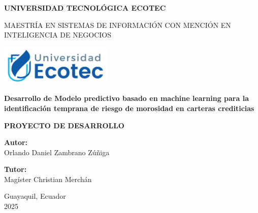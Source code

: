 \begin{titlepage}
    \begin{center}
        \vspace*{0.5cm}
        
        \Huge
        \textbf{UNIVERSIDAD TECNOLÓGICA ECOTEC}
        
        \vspace{1cm}
        
        \Large
        MAESTRÍA EN SISTEMAS DE INFORMACIÓN CON MENCIÓN EN INTELIGENCIA DE NEGOCIOS
        
        \vspace{0.5 cm}
        
        \includegraphics[width=0.4\textwidth]{images/logo.jpg}
        
        \vspace{0.5 cm}
        
        \Huge
        \textbf{Desarrollo de Modelo predictivo basado en machine learning para la identificación temprana de riesgo de morosidad en carteras crediticias}
        
        \vspace{0.5 cm}
        
        \Large
        \textbf{PROYECTO DE DESARROLLO}
        
        \vspace{0.5 cm}
        
        \Large
        \textbf{Autor:}\\
        Orlando Daniel Zambrano Zúñiga\\
        
        \vspace{0.5cm}
        
        \textbf{Tutor:}\\
        Magíster Christian Merchán\\
        
        \vfill
        
        \Large
        Guayaquil, Ecuador\\
        2025
    \end{center}
\end{titlepage}

